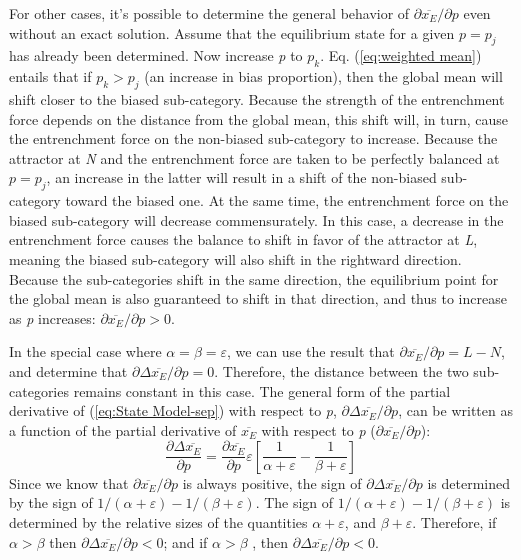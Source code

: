 For other cases, it's possible to determine the general behavior of
${\partial\overline{x_{E}}}/{\partial p}$ even without an exact
solution. Assume that the equilibrium state for a given $p=p_{j}$
has already been determined. Now increase \emph{p} to $p_{k}$. Eq.
(\ref{eq:weighted mean}) entails that if $p_{k}>p_{j}$ (an increase
in bias proportion), then the global mean will shift closer to the
biased sub-category. Because the strength of the entrenchment force
depends on the distance from the global mean, this shift will, in
turn, cause the entrenchment force on the non-biased sub-category
to increase. Because the attractor at \emph{N} and the entrenchment
force are taken to be perfectly balanced at $p=p_{j}$, an increase
in the latter will result in a shift of the non-biased sub-category
toward the biased one. At the same time, the entrenchment force on
the biased sub-category will decrease commensurately. In this case,
a decrease in the entrenchment force causes the balance to shift in
favor of the attractor at \emph{L}, meaning the biased sub-category
will also shift in the rightward direction. Because the sub-categories
shift in the same direction, the equilibrium point for the global
mean is also guaranteed to shift in that direction, and thus to increase
as \emph{p} increases: ${\partial\overline{x_{E}}}/{\partial p}>0$. 

In the special case where $\alpha=\beta=\varepsilon$, we can use
the result that ${\partial\overline{x_{E}}}/{\partial p}=L-N$,
and determine that ${\partial\Delta\overline{x_{E}}}/{\partial p}=0$.
Therefore, the distance between the two sub-categories remains constant
in this case. The general form of the partial derivative of (\ref{eq:State Model-sep})
with respect to \emph{p}, ${\partial\Delta\overline{x_{E}}}/{\partial p}$,
can be written as a function of the partial derivative of $\overline{x_{E}}$
with respect to \emph{p} (${\partial\overline{x_{E}}}/{\partial p}$):
\begin{equation}
\frac{\partial\Delta\overline{x_{E}}}{\partial p}=\frac{\partial\overline{x_{E}}}{\partial p}\varepsilon\left[\frac{1}{\alpha+\varepsilon}-\frac{1}{\beta+\varepsilon}\right]\label{eq: Model G: dsep/dp}
\end{equation}
Since we know that ${\partial\overline{x_{E}}}/{\partial p}$
is always positive, the sign of ${\partial\Delta\overline{x_{E}}}/{\partial p}$
is determined by the sign of ${1}/({\alpha+\varepsilon})-{1}/({\beta+\varepsilon})$.
The sign of ${1}/({\alpha+\varepsilon})-{1}/({\beta+\varepsilon})$
is determined by the relative sizes of the quantities $\alpha+\varepsilon$,
and $\beta+\varepsilon$. Therefore, if $\alpha>\beta$ then ${\partial\Delta\overline{x_{E}}}/{\partial p}<0$;
and if $\alpha>\beta$ , then ${\partial\Delta\overline{x_{E}}}/{\partial p}<0$.


